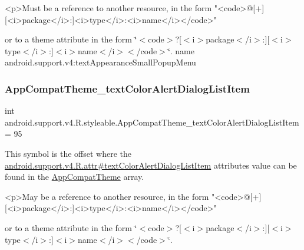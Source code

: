 \begin{DoxyVerb}      <p>Must be a reference to another resource, in the form "<code>@[+][<i>package</i>:]<i>type</i>:<i>name</i></code>"
\end{DoxyVerb}
 or to a theme attribute in the form \char`\"{}$<$code$>$?\mbox{[}$<$i$>$package$<$/i$>$\+:\mbox{]}\mbox{[}$<$i$>$type$<$/i$>$\+:\mbox{]}$<$i$>$name$<$/i$>$$<$/code$>$\char`\"{}.  name android.\+support.\+v4\+:text\+Appearance\+Small\+Popup\+Menu \mbox{\label{classandroid_1_1support_1_1v4_1_1R_1_1styleable_a635d1d4e8c44021e9a86c648aa1353ac}} 
\subsubsection{\texorpdfstring{App\+Compat\+Theme\+\_\+text\+Color\+Alert\+Dialog\+List\+Item}{AppCompatTheme\_textColorAlertDialogListItem}}
{\footnotesize\ttfamily int android.\+support.\+v4.\+R.\+styleable.\+App\+Compat\+Theme\+\_\+text\+Color\+Alert\+Dialog\+List\+Item = 95\hspace{0.3cm}{\ttfamily [static]}}

This symbol is the offset where the \hyperlink{classandroid_1_1support_1_1v4_1_1R_1_1attr_a03a5e3e3dd99d4e3da661dc7f6c22b3a}{android.\+support.\+v4.\+R.\+attr\#text\+Color\+Alert\+Dialog\+List\+Item} attribute\textquotesingle{}s value can be found in the \hyperlink{classandroid_1_1support_1_1v4_1_1R_1_1styleable_ac07ebbe62ed977f6dcaadc6397840ace}{App\+Compat\+Theme} array.

\begin{DoxyVerb}      <p>May be a reference to another resource, in the form "<code>@[+][<i>package</i>:]<i>type</i>:<i>name</i></code>"
\end{DoxyVerb}
 or to a theme attribute in the form \char`\"{}$<$code$>$?\mbox{[}$<$i$>$package$<$/i$>$\+:\mbox{]}\mbox{[}$<$i$>$type$<$/i$>$\+:\mbox{]}$<$i$>$name$<$/i$>$$<$/code$>$\char`\"{}. 

